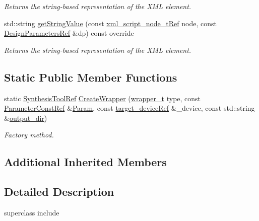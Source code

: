\begin{DoxyCompactItemize}
\begin{DoxyCompactList}\small\item\em Returns the string-\/based representation of the X\+ML element. \end{DoxyCompactList}\item 
std\+::string \hyperlink{classSynopsysWrapper_a2466100fbd55e3ec1c466841d35aa2d9}{get\+String\+Value} (const \hyperlink{xml__script__command_8hpp_a1fe3d50ade66bc35e41be9b68bbbcd02}{xml\+\_\+script\+\_\+node\+\_\+t\+Ref} node, const \hyperlink{DesignParameters_8hpp_ae36bb1c4c9150d0eeecfe1f96f42d157}{Design\+Parameters\+Ref} \&dp) const override
\begin{DoxyCompactList}\small\item\em Returns the string-\/based representation of the X\+ML element. \end{DoxyCompactList}\end{DoxyCompactItemize}
\subsection*{Static Public Member Functions}
\begin{DoxyCompactItemize}
\item 
static \hyperlink{SynthesisTool_8hpp_af82cb8fc071612a27507a7c212097e58}{Synthesis\+Tool\+Ref} \hyperlink{classSynopsysWrapper_a2d8acea1cdbd8bf8680dcb4d0fd22cb6}{Create\+Wrapper} (\hyperlink{classSynopsysWrapper_aab689f1a6257beb3a60b6e3df4a718c6}{wrapper\+\_\+t} type, const \hyperlink{Parameter_8hpp_a37841774a6fcb479b597fdf8955eb4ea}{Parameter\+Const\+Ref} \&\hyperlink{classSynthesisTool_a854ef102782ff4d069e1aa6d1a94d64e}{Param}, const \hyperlink{target__device_8hpp_acedb2b7a617e27e6354a8049fee44eda}{target\+\_\+device\+Ref} \&\+\_\+device, const std\+::string \&\hyperlink{classSynthesisTool_a285793f6f539ed6f049c375cdb68d607}{output\+\_\+dir})
\begin{DoxyCompactList}\small\item\em Factory method. \end{DoxyCompactList}\end{DoxyCompactItemize}
\subsection*{Additional Inherited Members}


\subsection{Detailed Description}
superclass include 

